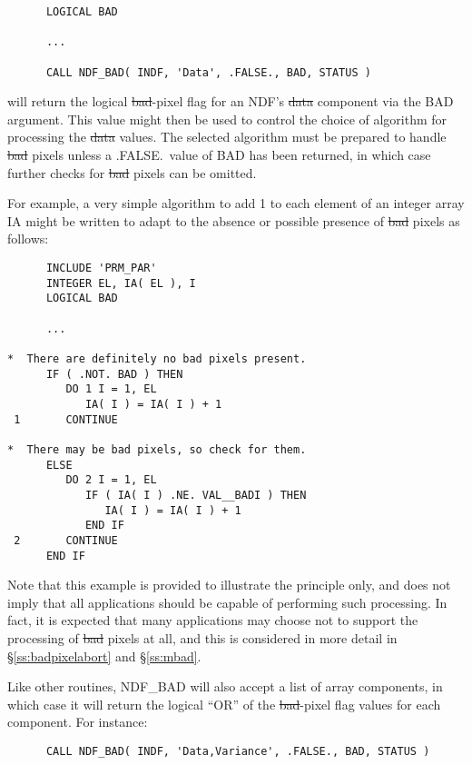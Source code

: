 \small
\begin{verbatim}
      LOGICAL BAD

      ...

      CALL NDF_BAD( INDF, 'Data', .FALSE., BAD, STATUS )
\end{verbatim}
\normalsize

will return the logical \st{bad\/}-pixel flag for an NDF's \st{data\/} component
via the BAD argument.
This value might then be used to control the choice of algorithm for
processing the \st{data\/} values. 
The selected algorithm must be prepared to handle \st{bad\/} pixels unless a
.FALSE.\ value of BAD has been returned, in which case further checks
for \st{bad\/} pixels can be omitted.  

For example, a very simple algorithm to add 1 to each element of an integer
array IA might be written to adapt to the absence or possible presence of
\st{bad\/} pixels as follows: 

\small
\begin{verbatim}
      INCLUDE 'PRM_PAR'
      INTEGER EL, IA( EL ), I
      LOGICAL BAD

      ...

*  There are definitely no bad pixels present.
      IF ( .NOT. BAD ) THEN
         DO 1 I = 1, EL
            IA( I ) = IA( I ) + 1
 1       CONTINUE

*  There may be bad pixels, so check for them.
      ELSE
         DO 2 I = 1, EL
            IF ( IA( I ) .NE. VAL__BADI ) THEN
               IA( I ) = IA( I ) + 1
            END IF
 2       CONTINUE
      END IF
\end{verbatim}
\normalsize

Note that this example is provided to illustrate the principle only, and
does not imply that all applications should be capable of performing such 
processing.
In fact, it is expected that many applications may choose not to support the
processing of \st{bad\/} pixels at all, and this is considered in more detail
in \S\ref{ss:badpixelabort} and \S\ref{ss:mbad}. 

Like other routines, NDF\_BAD will also accept a list of array components,
in which case it will return the logical ``OR'' of the \st{bad\/}-pixel flag
values for each component. 
For instance:

\small
\begin{verbatim}
      CALL NDF_BAD( INDF, 'Data,Variance', .FALSE., BAD, STATUS )
\end{verbatim}
\normalsize

